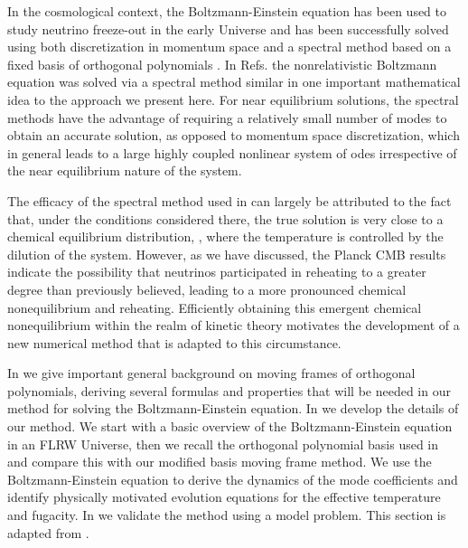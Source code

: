 In the cosmological context, the Boltzmann-Einstein equation has been used to study neutrino freeze-out in the early Universe and has been successfully solved using both discretization in momentum space \cite{Hannestad:1995rs,Dolgov:1997mb,Dolgov:1998sf,Gnedin:1997vn,Mangano:2005cc} and a spectral method based on a fixed basis of orthogonal polynomials \cite{Esposito:2000hi,Mangano:2001iu}.    In Refs.\cite{Wilkening,Wilkening2} the nonrelativistic Boltzmann equation was solved via a spectral method similar in  one important mathematical idea to the approach we present here.  For near equilibrium solutions, the spectral methods have the advantage of requiring a relatively small number of modes to obtain an accurate solution, as opposed to momentum space discretization, which in general leads to a large highly coupled nonlinear system of odes irrespective of the near equilibrium nature of the system.  

The efficacy of the spectral method used in \cite{Esposito:2000hi,Mangano:2001iu} can largely be attributed to the fact that, under the conditions considered there, the true solution is very close to a chemical equilibrium distribution, , where the temperature is controlled by the dilution of the system. However, as we have discussed, the Planck CMB results \cite{Planck:2013pxb} indicate the possibility that neutrinos participated in reheating to a greater degree than previously believed, leading to a more pronounced chemical nonequilibrium and reheating. Efficiently obtaining this emergent chemical nonequilibrium within the realm of kinetic theory motivates the development of a new numerical method that is adapted to this  circumstance.

In    we give important general background on moving frames of orthogonal polynomials, deriving several formulas and properties that will be needed in our method for solving the Boltzmann-Einstein equation. In  we develop the details of our method. We start with a basic overview of the Boltzmann-Einstein equation in an FLRW Universe, then we recall the orthogonal polynomial basis used in \cite{Esposito:2000hi,Mangano:2001iu} and compare this with our modified basis moving frame method.  We use the Boltzmann-Einstein equation to derive the dynamics of the mode coefficients and identify physically motivated evolution equations for the effective temperature and fugacity. In  we validate the method using a model problem. This section is adapted from \cite{Birrell:2014ona,Birrell:2014gea,Birrell:2014uka}.

